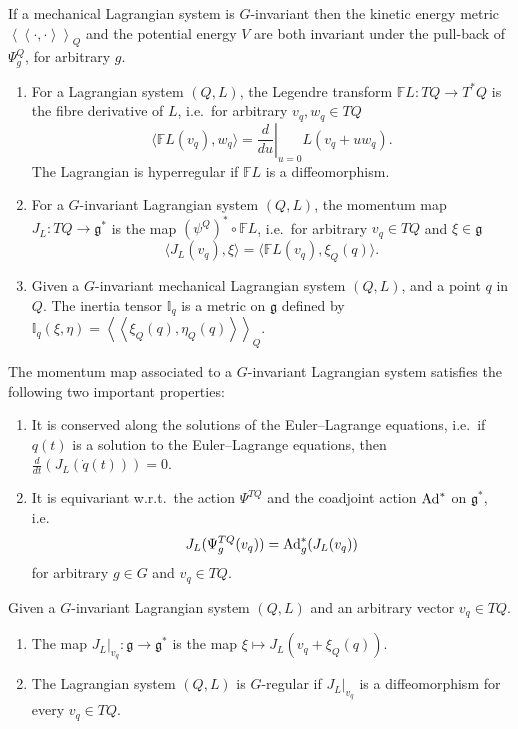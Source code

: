 \documentclass[pdftex]{sigma}
\renewcommand{\ll}{\left<\!\left<}
\renewcommand{\gg}{\right>\!\right>}
\newcommand{\lag}{\mathfrak{g}}
\newcommand{\F}{\mathbb{F}}
\begin{document}
If a mechanical Lagrangian system is $G$-invariant then the kinetic energy metric $\ll \cdot, \cdot \gg_Q$ and the potential energy $V$ are both invariant under the pull-back of $\Psi^Q_g$, for arbitrary $g$.

\begin{definition}\mbox{}
\begin{enumerate}\itemsep=0pt
\item For a Lagrangian system $(Q,L)$, the Legendre transform $\F L:TQ\to T^*Q$ is the f\/ibre derivative of $L$, i.e.\ for arbitrary $v_q,w_q\in TQ$
\[\langle \F L(v_q), w_q\rangle  = \left.\frac{d}{du}\right|_{u=0} L(v_q+u w_q).\]
The Lagrangian is hyperregular if $\F L$ is a dif\/feomorphism.
\item For a $G$-invariant Lagrangian system $(Q,L)$, the momentum map $J_L : TQ\to \lag^*$ is the map $(\psi^Q)^*\circ \F L$, i.e.\ for arbitrary  $v_q\in TQ$ and $\xi \in \lag$
\[\langle J_L(v_q),\xi\rangle = \langle \F L(v_q) , \xi_{Q}(q)\rangle.\]
\item Given a $G$-invariant mechanical Lagrangian system $(Q,L)$, and a point $q$ in $Q$. The inertia tensor $\mathbb{I}_q$ is a metric on $\lag$ def\/ined by $\mathbb{I}_q(\xi,\eta)= \ll \xi_Q(q),\eta_Q(q)\gg_Q$.
\end{enumerate}
\end{definition}
The momentum map associated to a $G$-invariant Lagrangian system satisf\/ies the following two important properties:
\begin{enumerate}\itemsep=0pt \item It is conserved along the solutions of the Euler--Lagrange equations, i.e.\ if $q(t)$ is a solution to the Euler--Lagrange equations, then $\frac{d}{dt} \left(J_L(\dot q(t))\right)=0$.
\item It is equivariant w.r.t.\ the action $\Psi^{TQ}$ and the coadjoint action ${\rm Ad}^*$ on $\lag^*$, i.e.\ \[J_L(\Psi^{TQ}_g(v_q)) = {\rm Ad}^*_g(J_L(v_q))\] for arbitrary $g\in G$ and $v_q\in TQ$.
\end{enumerate}

\begin{definition} Given a $G$-invariant Lagrangian system $(Q,L)$ and an arbitrary vector $v_q\in TQ$.{\samepage
\begin{enumerate}\itemsep=0pt
\item The map $J_L|_{v_q}: \lag \to \lag^*$ is the map $\xi \mapsto J_L(v_q+\xi_Q(q))$.
\item The Lagrangian system $(Q,L)$ is  $G$-regular if $J_L|_{v_q}$ is a dif\/feomorphism for every $v_q\in TQ$.
\end{enumerate}}
\end{definition}
\end{document}
